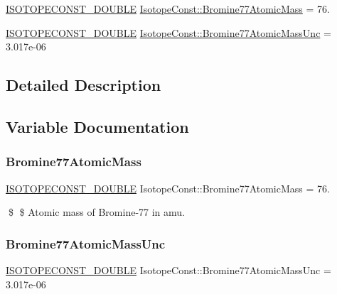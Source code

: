 \begin{DoxyCompactItemize}
\item 
\mbox{\hyperlink{group___isotope_const-_macros_ga8f45a7272ce02c0b4c65c44636ed719a}{I\+S\+O\+T\+O\+P\+E\+C\+O\+N\+S\+T\+\_\+\+D\+O\+U\+B\+LE}} \mbox{\hyperlink{group___isotope_const-_bromine-_br77_ga741ee38fdc97d80bcac0413c9d3961ce}{Isotope\+Const\+::\+Bromine77\+Atomic\+Mass}} = 76.
\item 
\mbox{\hyperlink{group___isotope_const-_macros_ga8f45a7272ce02c0b4c65c44636ed719a}{I\+S\+O\+T\+O\+P\+E\+C\+O\+N\+S\+T\+\_\+\+D\+O\+U\+B\+LE}} \mbox{\hyperlink{group___isotope_const-_bromine-_br77_ga2b63ce502f912725050e2b5f8c1e339f}{Isotope\+Const\+::\+Bromine77\+Atomic\+Mass\+Unc}} = 3.\+017e-\/06
\end{DoxyCompactItemize}


\subsection{Detailed Description}


\subsection{Variable Documentation}
\mbox{\label{group___isotope_const-_bromine-_br77_ga741ee38fdc97d80bcac0413c9d3961ce}} 
\subsubsection{\texorpdfstring{Bromine77\+Atomic\+Mass}{Bromine77AtomicMass}}
{\footnotesize\ttfamily \mbox{\hyperlink{group___isotope_const-_macros_ga8f45a7272ce02c0b4c65c44636ed719a}{I\+S\+O\+T\+O\+P\+E\+C\+O\+N\+S\+T\+\_\+\+D\+O\+U\+B\+LE}} Isotope\+Const\+::\+Bromine77\+Atomic\+Mass = 76.}

\$ \$ Atomic mass of Bromine-\/77 in amu. \mbox{\label{group___isotope_const-_bromine-_br77_ga2b63ce502f912725050e2b5f8c1e339f}} 
\subsubsection{\texorpdfstring{Bromine77\+Atomic\+Mass\+Unc}{Bromine77AtomicMassUnc}}
{\footnotesize\ttfamily \mbox{\hyperlink{group___isotope_const-_macros_ga8f45a7272ce02c0b4c65c44636ed719a}{I\+S\+O\+T\+O\+P\+E\+C\+O\+N\+S\+T\+\_\+\+D\+O\+U\+B\+LE}} Isotope\+Const\+::\+Bromine77\+Atomic\+Mass\+Unc = 3.\+017e-\/06}


